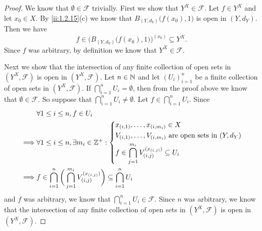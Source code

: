\begin{proof}
  We know that \(\emptyset \in \mathcal{F}\) trivially.
  First we show that \(Y^X \in \mathcal{F}\).
  Let \(f \in Y^X\) and let \(x_0 \in X\).
  By \cref{ii:1.2.15}(c) we know that \(B_{(Y, d_Y)}\big(f(x_0), 1\big)\) is open in \((Y, d_Y)\).
  Then we have
  \[
    f \in \Big(B_{(Y, d_Y)}\big(f(x_0), 1\big)\Big)^{(x_0)} \subseteq Y^X.
  \]
  Since \(f\) was arbitrary, by definition we know that \(Y^X \in \mathcal{F}\).

  Next we show that the intersection of any finite collection of open sets in \((Y^X, \mathcal{F})\) is open in \((Y^X, \mathcal{F})\).
  Let \(n \in \mathbb{N}\) and let \((U_i)_{i = 1}^n\) be a finite collection of open sets in \((Y^X, \mathcal{F})\).
  If \(\bigcap_{i = 1}^n U_i = \emptyset\), then from the proof above we know that \(\emptyset \in \mathcal{F}\).
  So suppose that \(\bigcap_{i = 1}^n U_i \neq \emptyset\).
  Let \(f \in \bigcap_{i = 1}^n U_i\).
  Since
  \begin{align*}
             & \forall 1 \leq i \leq n, f \in U_i                                                                                  \\
    \implies & \forall 1 \leq i \leq n, \exists m_i \in \mathbb{Z}^+ : \begin{dcases}
                                                                 x_{(i, 1)}, \dots, x_{(i, m_i)} \in X                              \\
                                                                 V_{(i, 1)}, \dots, V_{(i, m_i)} \text{ are open sets in } (Y, d_Y) \\
                                                                 f \in \bigcap_{j = 1}^{m_i} V_{(i, j)}^{(x_{(i, j)})} \subseteq U_i
                                                               \end{dcases}  \\
    \implies & f \in \bigcap_{i = 1}^n \bigg(\bigcap_{j = 1}^{m_i} V_{(i, j)}^{(x_{(i, j)})}\bigg) \subseteq \bigcap_{i = 1}^n U_i
  \end{align*}
  and \(f\) was arbitrary, we know that \(\bigcap_{i = 1}^n U_i \in \mathcal{F}\).
  Since \(n\) was arbitrary, we know that the intersection of any finite collection of open sets in \((Y^X, \mathcal{F})\) is open in \((Y^X, \mathcal{F})\).


\end{proof}
